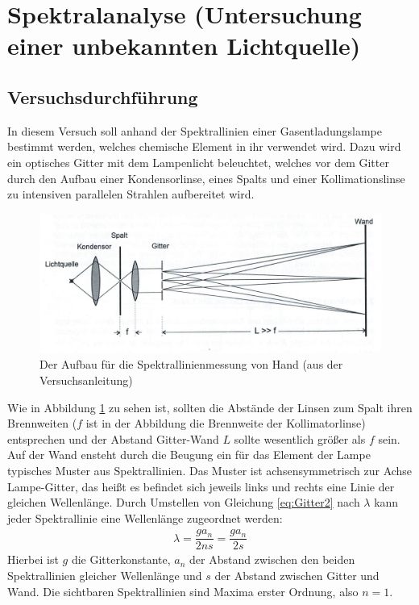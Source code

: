 \documentclass{scrartcl}
\begin{document}
\section{Spektralanalyse (Untersuchung einer unbekannten Lichtquelle)}
\subsection{Versuchsdurchführung}
In diesem Versuch soll anhand der Spektrallinien einer Gasentladungslampe bestimmt werden, welches chemische Element in ihr verwendet wird. Dazu wird ein optisches Gitter mit dem Lampenlicht beleuchtet, welches vor dem Gitter durch den Aufbau einer Kondensorlinse, eines Spalts und einer Kollimationslinse zu intensiven parallelen Strahlen aufbereitet wird.
\begin{figure}[H]
  \centering
    \includegraphics[scale=0.75]{Aufbau.PNG}
  \caption{Der Aufbau für die Spektrallinienmessung von Hand (aus der Versuchsanleitung)}
  \label{fig:Aufbau}
\end{figure}
Wie in Abbildung \ref{fig:Aufbau} zu sehen ist, sollten die Abstände der Linsen zum Spalt ihren Brennweiten ($f$ ist in der Abbildung die Brennweite der Kollimatorlinse) entsprechen und der Abstand Gitter-Wand $L$ sollte wesentlich größer als $f$ sein. Auf der Wand ensteht durch die Beugung ein für das Element der Lampe typisches Muster aus Spektrallinien. Das Muster ist achsensymmetrisch zur Achse Lampe-Gitter, das heißt es befindet sich jeweils links und rechts eine Linie der gleichen Wellenlänge. Durch Umstellen von Gleichung \ref{eq:Gitter2} nach $\lambda$ kann jeder Spektrallinie eine Wellenlänge zugeordnet werden:
\begin{align*}
\lambda = \dfrac{g a_{n}}{2 n s} = \dfrac{g a_{n}}{2 s}
\end{align*}
Hierbei ist $g$ die Gitterkonstante, $a_{n}$ der Abstand zwischen den beiden Spektrallinien gleicher Wellenlänge und $s$ der Abstand zwischen Gitter und Wand. Die sichtbaren Spektrallinien sind Maxima erster Ordnung, also $n = 1$. \\
\end{document}
